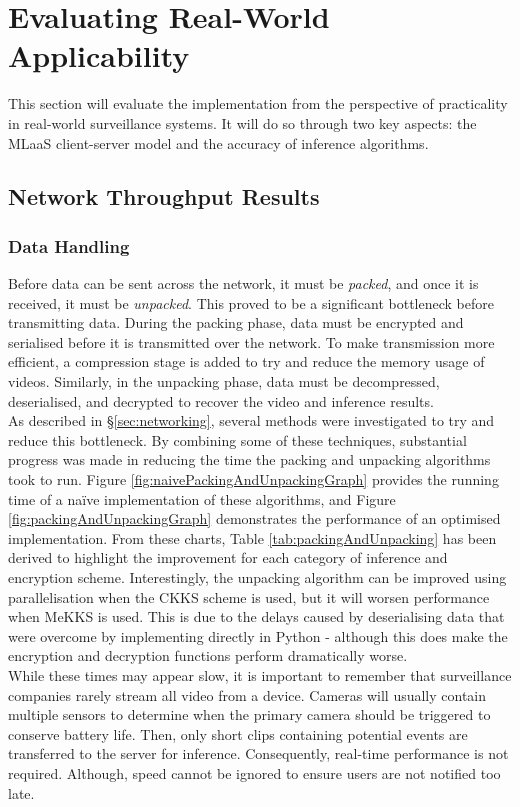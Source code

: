 \section{Evaluating Real-World Applicability}
\indent \indent
This section will evaluate the implementation from the perspective of practicality in real-world surveillance systems. It will do so through two key aspects: the MLaaS client-server model and the accuracy of inference algorithms.

\subsection{Network Throughput Results}
\subsubsection{Data Handling}
\indent \indent
Before data can be sent across the network, it must be \textit{packed}, and once it is received, it must be \textit{unpacked}. This proved to be a significant bottleneck before transmitting data. During the packing phase, data must be encrypted and serialised before it is transmitted over the network. To make transmission more efficient, a compression stage is added to try and reduce the memory usage of videos. Similarly, in the unpacking phase, data must be decompressed, deserialised, and decrypted to recover the video and inference results.
\smallskip \\ \indent
As described in §\ref{sec:networking}, several methods were investigated to try and reduce this bottleneck. By combining some of these techniques, substantial progress was made in reducing the time the packing and unpacking algorithms took to run. Figure \ref{fig:naivePackingAndUnpackingGraph} provides the running time of a na\"ive implementation of these algorithms, and Figure \ref{fig:packingAndUnpackingGraph} demonstrates the performance of an optimised implementation. From these charts, Table \ref{tab:packingAndUnpacking} has been derived to highlight the improvement for each category of inference and encryption scheme. Interestingly, the unpacking algorithm can be improved using parallelisation when the CKKS scheme is used, but it will worsen performance when MeKKS is used. This is due to the delays caused by deserialising data that were overcome by implementing directly in Python - although this does make the encryption and decryption functions perform dramatically worse.
\smallskip \\ \indent
While these times may appear slow, it is important to remember that surveillance companies rarely stream all video from a device. Cameras will usually contain multiple sensors to determine when the primary camera should be triggered to conserve battery life. Then, only short clips containing potential events are transferred to the server for inference. Consequently, real-time performance is not required. Although, speed cannot be ignored to ensure users are not notified too late.
